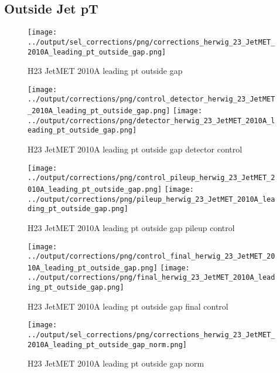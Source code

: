 \documentclass[11pt]{book}
\begin{document}
\clearpage
\subsection{Outside Jet pT}
\begin{figure}[ht]
\centering
\texttt{[image: ../output/sel\_corrections/png/corrections\_herwig\_23\_JetMET\_2010A\_leading\_pt\_outside\_gap.png]}
\caption{H23 JetMET 2010A leading pt outside gap}
\label{fig:H23_JetMET_2010A_leading_pt_outside_gap}
\end{figure}

\begin{figure}[ht]
\centering
\texttt{[image: ../output/corrections/png/control\_detector\_herwig\_23\_JetMET\_2010A\_leading\_pt\_outside\_gap.png]}
\texttt{[image: ../output/corrections/png/detector\_herwig\_23\_JetMET\_2010A\_leading\_pt\_outside\_gap.png]}
\caption{H23 JetMET 2010A leading pt outside gap detector control}
\label{fig:H23_JetMET_2010A_leading_pt_outside_gap_detector_control}
\end{figure}

\begin{figure}[ht]
\centering
\texttt{[image: ../output/corrections/png/control\_pileup\_herwig\_23\_JetMET\_2010A\_leading\_pt\_outside\_gap.png]}
\texttt{[image: ../output/corrections/png/pileup\_herwig\_23\_JetMET\_2010A\_leading\_pt\_outside\_gap.png]}
\caption{H23 JetMET 2010A leading pt outside gap pileup control}
\label{fig:H23_JetMET_2010A_leading_pt_outside_gap_pileup_control}
\end{figure}


\begin{figure}[ht]
\centering
\texttt{[image: ../output/corrections/png/control\_final\_herwig\_23\_JetMET\_2010A\_leading\_pt\_outside\_gap.png]}
\texttt{[image: ../output/corrections/png/final\_herwig\_23\_JetMET\_2010A\_leading\_pt\_outside\_gap.png]}
\caption{H23 JetMET 2010A leading pt outside gap final control}
\label{fig:H23_JetMET_2010A_leading_pt_outside_gap_final_control}
\end{figure}



\begin{figure}[ht]
\centering
\texttt{[image: ../output/sel\_corrections/png/corrections\_herwig\_23\_JetMET\_2010A\_leading\_pt\_outside\_gap\_norm.png]}
\caption{H23 JetMET 2010A leading pt outside gap norm}
\label{fig:H23_JetMET_2010A_leading_pt_outside_gap_norm}
\end{figure}
\end{document}
